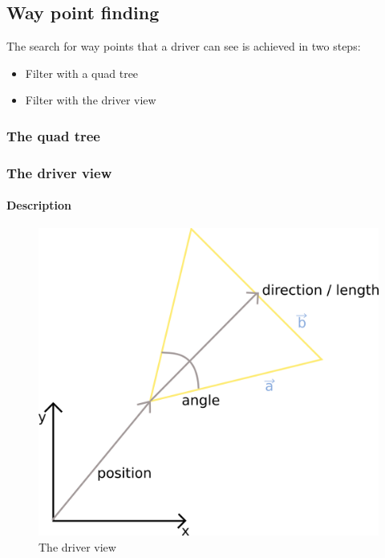 \subsection{Way point finding}

The search for way points that a driver can see is achieved in two steps:

\begin{itemize}
\item Filter with a quad tree
\item Filter with the driver view
\end{itemize}


\subsubsection{The quad tree}
\label{sec:quadTree}



\subsubsection{The driver view}
\label{sec:driverView}

\paragraph{Description}

\begin{figure}
\begin{center}
\includegraphics[scale=0.4]{images/driverview.png}
\end{center}
\caption{The driver view}
\label{fig:driverView}
\end{figure}


